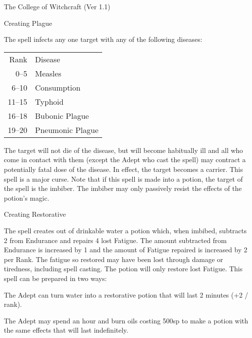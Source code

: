 \begin{Chapter}{The College of Witchcraft (Ver 1.1)}
\begin{spell}[S-8]{Creating Plague}

\begin{effects}
The spell infects any one target with any of 
the following diseases: 

\begin{tabularx}{\columnwidth}{rX}
Rank	& Disease \\
0–5	& Measles \\
6–10	& Consumption \\
11–15	& Typhoid \\
16–18	& Bubonic Plague \\
19–20	& Pneumonic Plague \\
\end{tabularx}

The target will not die of the disease, but will become habitually ill
and all who come in contact with them (except the Adept who cast the
spell) may contract a potentially fatal dose of the disease.  In
effect, the target becomes a carrier. This spell is a major curse.
Note that if this spell is made into a potion, the target of the spell
is the imbiber.  The imbiber may only passively resist the effects of
the potion’s magic.
\end{effects}
\end{spell}

\begin{spell}[S-9]{Creating Restorative}

\begin{effects}
The spell creates out of drinkable water a potion which, when imbibed,
subtracts 2 from Endurance and repairs 4 lost Fatigue. The amount
subtracted from Endurance is increased by 1 and the amount of Fatigue
repaired is increased by 2 per Rank. The fatigue so restored may have
been lost through damage or tiredness, including spell casting.  The
potion will only restore lost Fatigue.  This spell can be prepared
in two ways:
\begin{Itemize}
\item The Adept can turn water into a restorative potion that will
  last 2 minutes (+2 / rank).

\item The Adept may spend an hour and burn oils costing 500sp to make
  a potion with the same effects that will last indefinitely.
\end{Itemize}


\end{effects}
\end{spell}
\end{Chapter}
